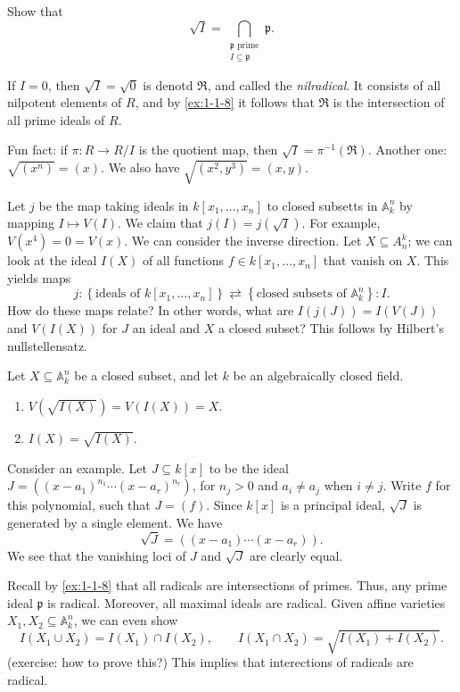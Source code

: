 \begin{exercise}\label{ex:1-1-9}
	Show that
	\[
		\sqrt{I} =\bigcap_{\substack{\mathfrak{p} \text{ prime} \\ I \subseteq \mathfrak{p} }} \mathfrak{p} 
	.\]
\end{exercise}

If $I=0$, then $\sqrt{I}=\sqrt{0}  $ is denotd $\mathfrak{R} $, and called the \emph{nilradical}. It consists of all nilpotent elements of $R$, and by \cref{ex:1-1-8} it follows that $\mathfrak{R} $ is the intersection of all prime ideals of $R$.

Fun fact: if $\pi : R \to R/I$ is the quotient map, then $\sqrt{I} =\pi ^{-1} (\mathfrak{R} )$. Another one: $\sqrt{(x^n)} =(x)$. We also have $\sqrt{(x^2,y^3)} =(x,y)$.

Let $j$ be the map taking ideals in $k[x_1, \ldots ,x_n]$ to closed subsetts in $\mathbb{A} _k^n$ by mapping $I\mapsto V(I)$. We claim that $j(I)=j(\sqrt{I} )$. For example, $V(x^4) = 0 = V(x)$. We can consider the inverse direction. Let $X\subseteq A_n^k$; we can look at the ideal $I(X)$ of all functions $f\in k[x_1, \ldots ,x_n]$ that vanish on $X$. This yields maps
\[
	j : \left\{ \text{ideals of } k[x_1, \ldots ,x_n] \right\} \rightleftarrows \left\{ \text{closed subsets of } \mathbb{A} _k^n \right\} : I
.\]
How do these maps relate? In other words, what are $I(j(J)) = I(V(J))$ and $V(I(X))$ for $J$ an ideal and $X$ a closed subset? This follows by Hilbert's nullstellensatz.

\begin{theorem}\label{thm:1-1-10}
	Let $X\subseteq \mathbb{A} _k^n$ be a closed subset, and let $k$ be an algebraically closed field.
	\begin{enumerate}
		\item $V(\sqrt{I(X)} )=V(I(X))=X$.
		\item $I(X) = \sqrt{I(X)} $.
	\end{enumerate}
\end{theorem}

Consider an example. Let $J\subseteq k[x]$ to be the ideal $J=((x-a_1)^{n_1} \cdots (x-a_r)^{n_r} )$, for $n_j>0$ and $a_i \neq a_j$ when $i\neq j$. Write $f$ for this polynomial, such that $J=(f)$. Since $k[x]$ is a principal ideal, $\sqrt{J} $ is generated by a single element. We have
\[
	\sqrt{J} =((x-a_1)\cdots (x-a_r))
.\]
We see that the vanishing loci of $J$ and $\sqrt{J} $ are clearly equal.


\begin{remark}\label{rmk:1-1-11}
	Recall by \cref{ex:1-1-8} that all radicals are intersections of primes. Thus, any prime ideal $\mathfrak{p} $ is radical. Moreover, all maximal ideals are radical. Given affine varieties $X_1,X_2 \subseteq \mathbb{A} _k^n$, we can even show
	\[
		I(X_1 \cup X_2) = I(X_1)\cap I(X_2),\qquad I(X_1 \cap X_2) = \sqrt{I(X_1)+I(X_2)} 
	.\]
	(exercise: how to prove this?) This implies that interections of radicals are radical.
\end{remark}
